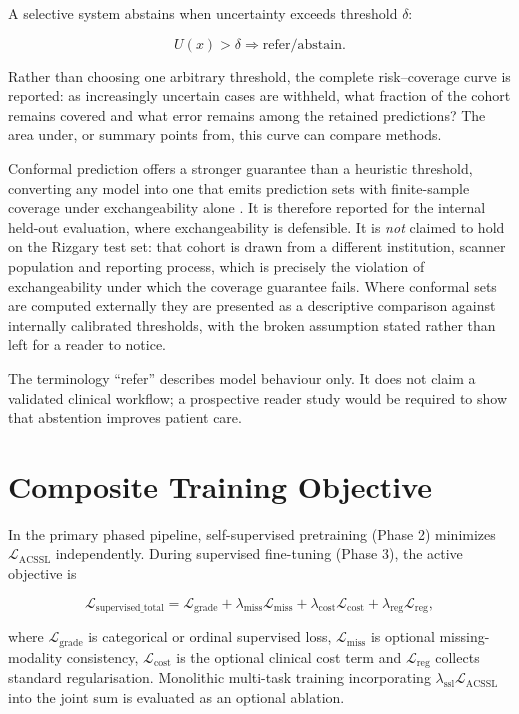 A selective system abstains when uncertainty exceeds threshold $\delta$:

\[
U(x)>\delta \Rightarrow \mathrm{refer/abstain}.
\]

Rather than choosing one arbitrary threshold, the complete risk--coverage curve
is reported: as increasingly uncertain cases are withheld, what fraction of the
cohort remains covered and what error remains among the retained predictions?
The area under, or summary points from, this curve can compare methods.

Conformal prediction offers a stronger guarantee than a heuristic threshold,
converting any model into one that emits prediction sets with finite-sample
coverage under exchangeability alone \cite{angelopoulos2023gentle}. It is
therefore reported for the internal held-out evaluation, where exchangeability
is defensible. It is \emph{not} claimed to hold on the Rizgary test set: that
cohort is drawn from a different institution, scanner population and reporting
process, which is precisely the violation of exchangeability under which the
coverage guarantee fails. Where conformal sets are computed externally they are
presented as a descriptive comparison against internally calibrated thresholds,
with the broken assumption stated rather than left for a reader to notice.

The terminology ``refer'' describes model behaviour only. It does not claim a
validated clinical workflow; a prospective reader study would be required to
show that abstention improves patient care.

\section{Composite Training Objective}
\label{sec:method-total-loss}

In the primary phased pipeline, self-supervised pretraining (Phase 2) minimizes $\mathcal{L}_{\mathrm{ACSSL}}$ independently. During supervised fine-tuning (Phase 3), the active objective is

\begin{equation}
\mathcal{L}_{\mathrm{supervised\_total}}
=
\mathcal{L}_{\mathrm{grade}}
+\lambda_{\mathrm{miss}}\mathcal{L}_{\mathrm{miss}}
+\lambda_{\mathrm{cost}}\mathcal{L}_{\mathrm{cost}}
+\lambda_{\mathrm{reg}}\mathcal{L}_{\mathrm{reg}},
\label{eq:total-loss}
\end{equation}

where $\mathcal{L}_{\mathrm{grade}}$ is categorical or ordinal supervised loss,
$\mathcal{L}_{\mathrm{miss}}$ is optional missing-modality consistency,
$\mathcal{L}_{\mathrm{cost}}$ is the optional clinical cost term and
$\mathcal{L}_{\mathrm{reg}}$ collects standard regularisation. Monolithic multi-task training incorporating $\lambda_{\mathrm{ssl}}\mathcal{L}_{\mathrm{ACSSL}}$ into the joint sum is evaluated as an optional ablation.

